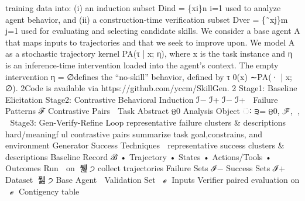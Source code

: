training data into: (i) an induction subset Dind = \{xi\}n
i=1 used to analyze agent behavior, and (ii) a
construction-time verification subset Dver = \{˜xj\}m
j=1 used for evaluating and selecting candidate
skills. We consider a base agent A that maps inputs to trajectories and that we seek to improve upon.
We model A as a stochastic trajectory kernel PA(τ | x; η), where x is the task instance and η is an
inference-time intervention loaded into the agent’s context. The empty intervention η = ∅defines
the “no-skill” behavior, defined by τ 0(x) ∼PA(· | x; ∅).
2Code is available via https://github.com/yccm/SkillGen.
2
Stage1: Baseline 
Elicitation
Stage2: Contrastive Behavioral 
Induction
ℐ−
ℐ+
ℐ−
ℐ+
੓
Failure Patterns ℱ
Contrastive Pairs ੒
Task Abstract ੪0 
Analysis Object
ઃ
੩=  ੪0, ℱ, ੢, ੒ 
Stage3: Gen-Verify-Refine Loop
representative 
failure clusters 
\& descriptions
hard/meaningf
ul contrastive 
pairs
summarize task 
goal,constrains, 
and environment
Generator
Success Techniques ੢
representative 
success clusters 
\& descriptions
Baseline Record ℬ
•
Trajectory
•
States
•
Actions/Tools
•
Outcomes 
Run ੐ on ੓풾੷੭
collect trajectories
Failure Sets ℐ−
Success Sets ℐ+
Dataset ੓풾੷੭
Base Agent ੐
Validation 
Set ੓੿ℯ੻
Inputs
Verifier
paired evaluation on ੓੿ℯ੻
Contigency table
 
